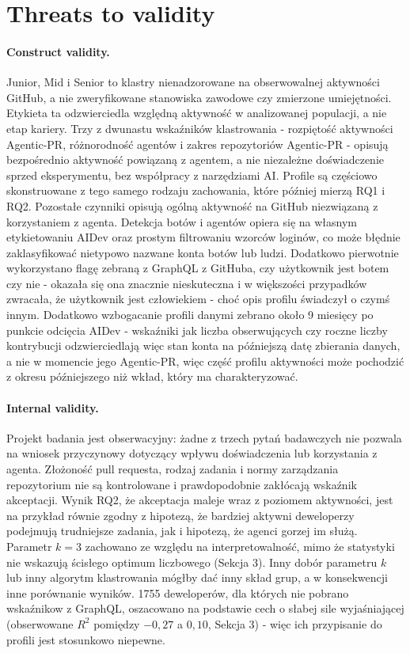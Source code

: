 \section{Threats to validity\label{sec:threats}}

\paragraph{Construct validity.}
Junior, Mid i Senior to klastry nienadzorowane na obserwowalnej aktywności GitHub, a nie zweryfikowane stanowiska zawodowe czy zmierzone umiejętności. Etykieta ta odzwierciedla względną aktywność w analizowanej populacji, a nie etap kariery. Trzy z dwunastu wskaźników klastrowania - rozpiętość aktywności Agentic-PR, różnorodność agentów i zakres repozytoriów Agentic-PR - opisują bezpośrednio aktywność powiązaną z agentem, a nie niezależne doświadczenie sprzed eksperymentu, bez współpracy z narzędziami AI. Profile są częściowo skonstruowane z tego samego rodzaju zachowania, które później mierzą RQ1 i RQ2. Pozostałe czynniki opisują ogólną aktywność na GitHub niezwiązaną z korzystaniem z agenta. Detekcja botów i agentów opiera się na własnym etykietowaniu AIDev oraz prostym filtrowaniu wzorców loginów, co może błędnie zaklasyfikować nietypowo nazwane konta botów lub ludzi. Dodatkowo pierwotnie wykorzystano flagę zebraną z GraphQL z GitHuba, czy użytkownik jest botem czy nie - okazała się ona znacznie nieskuteczna i w większości przypadków zwracała, że użytkownik jest człowiekiem - choć opis profilu świadczył o czymś innym. Dodatkowo wzbogacanie profili danymi zebrano około 9 miesięcy po punkcie odcięcia AIDev - wskaźniki jak liczba obserwujących czy roczne liczby kontrybucji odzwierciedlają więc stan konta na późniejszą datę zbierania danych, a nie w momencie jego Agentic-PR, więc część profilu aktywności może pochodzić z okresu późniejszego niż wkład, który ma charakteryzować.

\paragraph{Internal validity.}
Projekt badania jest obserwacyjny: żadne z trzech pytań badawczych nie pozwala na wniosek przyczynowy dotyczący wpływu doświadczenia lub korzystania z agenta. Złożoność pull requesta, rodzaj zadania i normy zarządzania repozytorium nie są kontrolowane i prawdopodobnie zakłócają wskaźnik akceptacji. Wynik RQ2, że akceptacja maleje wraz z poziomem aktywności, jest na przykład równie zgodny z hipotezą, że bardziej aktywni deweloperzy podejmują trudniejsze zadania, jak i hipotezą, że agenci gorzej im służą. Parametr $k=3$ zachowano ze względu na interpretowalność, mimo że statystyki nie wskazują ścisłego optimum liczbowego (Sekcja 3). Inny dobór parametru $k$ lub inny algorytm klastrowania mógłby dać inny skład grup, a w konsekwencji inne porównanie wyników. 1755 deweloperów, dla których nie pobrano wskaźnikow z GraphQL, oszacowano na podstawie cech o słabej sile wyjaśniającej (obserwowane $R^2$ pomiędzy $-0,27$ a $0,10$, Sekcja 3) - więc ich przypisanie do profili jest stosunkowo niepewne.


